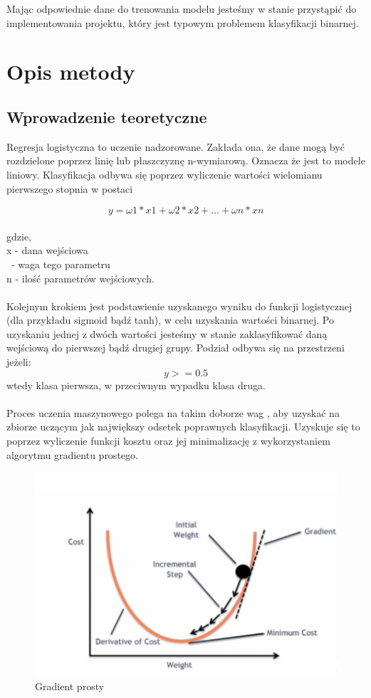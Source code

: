 \documentclass[11pt, a4paper, notitlepage]{report}
\begin{document}
Mając odpowiednie dane do trenowania modelu jesteśmy w stanie przystąpić do implementowania projektu, który jest typowym problemem klasyfikacji binarnej.

\chapter{Opis metody}
\section{Wprowadzenie teoretyczne}
Regresja logistyczna to uczenie nadzorowane. Zakłada ona, że dane mogą być rozdzielone poprzez linię lub płaszczyznę n-wymiarową. Oznacza że jest to modele liniowy. Klasyfikacja odbywa się poprzez wyliczenie wartości wielomianu pierwszego stopnia w postaci


$$ y =\omega 1 * x1+ \omega 2 * x2+… + \omega n* xn $$ \\
gdzie, \\
x - dana wejściowa \\
\textomega \, - waga tego parametru \\
n - ilość parametrów wejściowych. \\
\\
Kolejnym krokiem jest podstawienie uzyskanego wyniku do funkcji logistycznej (dla przykładu sigmoid bądź tanh), w celu uzyskania wartości binarnej. Po uzyskaniu jednej z dwóch wartości jesteśmy w stanie zaklasyfikować daną wejściową do pierwszej bądź drugiej grupy. Podział odbywa się na przestrzeni jeżeli:
$$ y >= 0.5 $$ wtedy klasa pierwsza, w przeciwnym wypadku klasa druga.
\\
\\
Proces uczenia maszynowego polega na takim doborze wag \textomega, aby uzyskać na zbiorze uczącym jak największy odsetek poprawnych klasyfikacji. Uzyskuje się to poprzez wyliczenie funkcji kosztu oraz jej minimalizację z wykorzystaniem algorytmu gradientu prostego. 
\newpage
\begin{figure}[h!]
  \includegraphics[scale=1]{graphics/gradient}
  \caption{Gradient prosty}
  \label{fig:gradient}
\end{figure}
\end{document}
